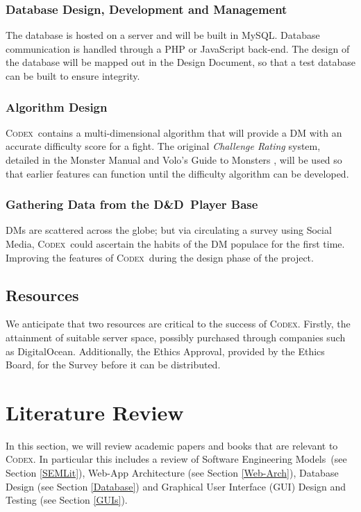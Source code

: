 \documentclass[final]{cmpreport}
\newcommand{\dnd}{D\&D}
\newcommand{\sems}{Software Engineering Models}
\newcommand{\Codex}{\textsc{Codex}}
\begin{document}
	\subsubsection{Database Design, Development and Management}
	The database is hosted on a server and will be built in MySQL. Database communication is handled through a PHP or JavaScript back-end. The design of the database will be mapped out in the Design Document, so that a test database can be built to ensure integrity. 
	
	\subsubsection{Algorithm Design}
	\Codex \ contains a multi-dimensional algorithm that will provide a DM with an accurate difficulty score for a fight. The original \emph{Challenge Rating} system, detailed in the Monster Manual \citep{MonsterManual} and Volo's Guide to Monsters  \citep{Volos}, will be used so that earlier features can function until the difficulty algorithm can be developed. 
	
	\subsubsection{Gathering Data from the \dnd \ Player Base}
	DMs are scattered across the globe; but via circulating a survey using Social Media, \Codex \ could ascertain the habits of the DM populace for the first time. Improving the features of \Codex \ during the design phase of the project.
	
	\subsection{Resources}
	We anticipate that two resources are critical to the success of \Codex. Firstly, the attainment of suitable server space, possibly purchased through companies such as DigitalOcean. Additionally, the Ethics Approval, provided by the Ethics Board, for the Survey before it can be distributed. 
	
	\clearpage
	
	\section{Literature Review}
	In this section, we will review academic papers and books that are relevant to \Codex. In particular this includes a review of \sems \ (see Section \ref{SEMLit}), Web-App Architecture (see Section \ref{Web-Arch}), Database Design (see Section \ref{Database}) and Graphical User Interface (GUI) Design and Testing (see Section \ref{GUIs}).
	
\end{document}

